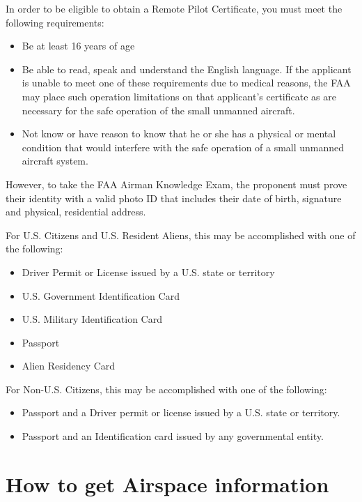 \documentclass[
]{book}
\providecommand{\tightlist}{%
  \setlength{\itemsep}{0pt}\setlength{\parskip}{0pt}}
\begin{document}
In order to be eligible to obtain a Remote Pilot Certificate, you must meet the following requirements:

\begin{itemize}
\tightlist
\item
  Be at least 16 years of age
\item
  Be able to read, speak and understand the English language. If the applicant is unable to meet one of these requirements due to medical reasons, the FAA may place such operation limitations on that applicant's certificate as are necessary for the safe operation of the small unmanned aircraft.
\item
  Not know or have reason to know that he or she has a physical or mental condition that would interfere with the safe operation of a small unmanned aircraft system.
\end{itemize}

However, to take the FAA Airman Knowledge Exam, the proponent must prove their identity with a valid photo ID that includes their date of birth, signature and physical, residential address.

For U.S. Citizens and U.S. Resident Aliens, this may be accomplished with one of the following:

\begin{itemize}
\tightlist
\item
  Driver Permit or License issued by a U.S. state or territory
\item
  U.S. Government Identification Card
\item
  U.S. Military Identification Card
\item
  Passport
\item
  Alien Residency Card
\end{itemize}

For Non-U.S. Citizens, this may be accomplished with one of the following:

\begin{itemize}
\tightlist
\item
  Passport and a Driver permit or license issued by a U.S. state or territory.
\item
  Passport and an Identification card issued by any governmental entity.
\end{itemize}

\hypertarget{ch-airspace-info}{%
\chapter{How to get Airspace information}\label{ch-airspace-info}}
\end{document}
